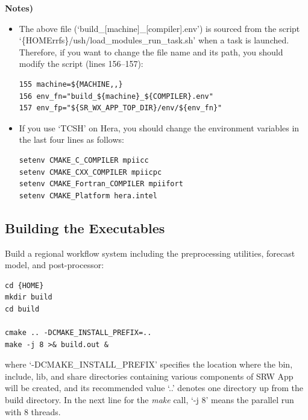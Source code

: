 \documentclass[11pt,fleqn]{report}              %
\begin{document}
{\bf Notes)} 
\begin{itemize}
\item The above file (`build\_[machine]\_[compiler].env') is sourced from the script `\{HOMErrfs\}/ush/load\_modules\_run\_task.sh' when a task is launched. Therefore, if you want to change the file name and its path, you should modify the script (lines 156--157):
\lstset{language=bash}   
\begin{lstlisting}[frame=trBL]
155 machine=${MACHINE,,}
156 env_fn="build_${machine}_${COMPILER}.env"
157 env_fp="${SR_WX_APP_TOP_DIR}/env/${env_fn}"
\end{lstlisting}

\item If you use `TCSH' on Hera, you should change the environment variables in the last four lines as follows:
\lstset{language=bash}   
\begin{lstlisting}[frame=trBL]
setenv CMAKE_C_COMPILER mpiicc
setenv CMAKE_CXX_COMPILER mpiicpc
setenv CMAKE_Fortran_COMPILER mpiifort
setenv CMAKE_Platform hera.intel
\end{lstlisting}
\end{itemize}



\subsection{Building the Executables}
\label{sec:build_exec}


Build a regional workflow system including the preprocessing utilities, forecast model, and post-processor:
\lstset{language=bash}   
\begin{lstlisting}[frame=trBL]
cd {HOME}
mkdir build
cd build

cmake .. -DCMAKE_INSTALL_PREFIX=..
make -j 8 >& build.out &
\end{lstlisting}
where `-DCMAKE\_INSTALL\_PREFIX' specifies the location where the bin, include, lib, and share directories containing various components of SRW App will be created, and its recommended value `..' denotes one directory up from the build directory. In the next line for the {\it make} call,  `-j 8' means the parallel run with 8 threads. \\
\end{document}
